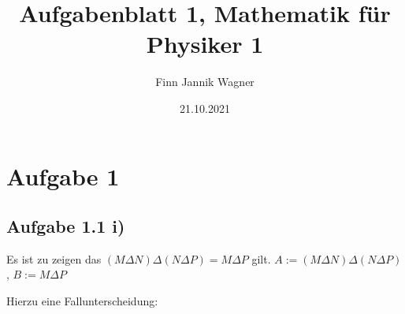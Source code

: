 \documentclass{article}
\date{21.10.2021}
\title{Aufgabenblatt 1, Mathematik für Physiker 1}
\author{Finn Jannik Wagner}
\begin{document}
    \maketitle
    
    \section*{Aufgabe 1}

        \subsection*{Aufgabe 1.1 i)}

        Es ist zu zeigen das \((M \Delta N) \Delta (N\Delta P) = M \Delta P\) gilt.
        \(A := (M \Delta N) \Delta (N\Delta P)\), \(B := M \Delta P\)

        Hierzu eine Fallunterscheidung:
\end{document}
